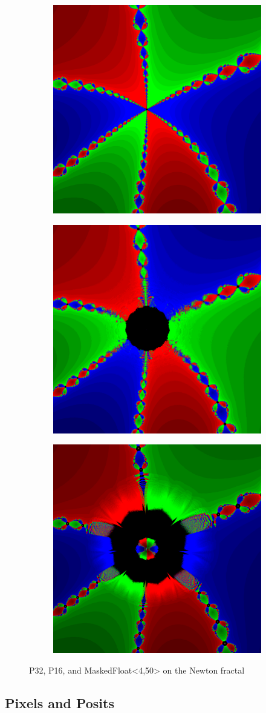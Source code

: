 \documentclass[sigconf,authorversion,nonacm]{acmart}
\begin{document}
\begin{figure}
    \begin{subfigure}[P32]
        \centering
        \includegraphics[width=0.31\linewidth]{images/3-newton-ripples/P32.png}
    \end{subfigure}
    \quad
    \begin{subfigure}[P16]
        \centering
        \includegraphics[width=0.31\linewidth]{images/3-newton-ripples/P16.png}
    \end{subfigure}
    \quad
    \begin{subfigure}[MaskedFloat<4,50>]
        \centering
        \includegraphics[width=0.31\linewidth]{images/3-newton-ripples/mf4.png}
    \end{subfigure}
    \caption{P32, P16, and MaskedFloat<4,50> on the Newton fractal}
    \label{fig:3-newton-ripples}
\end{figure}

\FloatBarrier
\setcounter{subsection}{28515624}
\subsection{Pixels and Posits\texttrademark}
\end{document}
